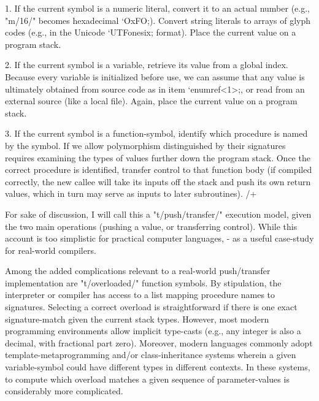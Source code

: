  1.  If the current symbol is a numeric literal, convert it to an actual number 
(e.g., "m/16/" becomes hexadecimal `OxFO;).  Convert 
string literals to arrays of glyph 
codes (e.g., in the Unicode `UTFonesix; format).  Place the current 
value on a program stack.

 2.  If the current symbol is a variable, retrieve 
its value from a global index.  Because every 
variable is initialized before use, we can assume that 
any value is ultimately obtained from source code 
as in item `enumref<1>;, or read from an external source (like a local file).
Again, place the current value on a program stack.

 3.  If the current symbol is a function-symbol, identify 
which procedure is named by the symbol.  If we allow 
polymorphism %
distinguished by their signatures %
requires examining the types of values further down the 
program stack.  Once the correct procedure is identified, 
transfer control to that function body (if compiled 
correctly, the new callee will take its inputs off the 
stack and push its own return values, which in turn 
may serve as inputs to later subroutines). 
/+

For sake of discussion, I will call this a "t/push/transfer/" execution 
model, given the two main operations (pushing a value, or transferring 
control).  While this account is too simplistic for practical computer 
languages, -%
as a useful case-study for real-world compilers.

Among the added complications relevant to a real-world push/transfer 
implementation are %
"t/overloaded/" function symbols.  By stipulation, the interpreter or compiler 
has access to a list mapping procedure names to signatures.  
Selecting a correct overload is straightforward if there is one exact 
signature-match given the current stack types.  However, most modern 
programming environments allow implicit type-casts (e.g., any integer is also 
a decimal, with fractional part zero).  Moreover, modern languages commonly 
adopt template-metaprogramming and/or class-inheritance systems wherein 
a given variable-symbol could have different types in different 
contexts.  In these systems, to compute which overload matches a 
given sequence of parameter-values is considerably more complicated.

